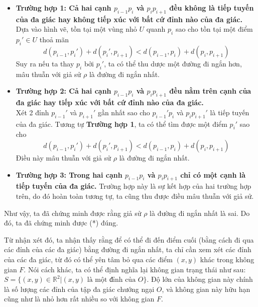 \documentclass[a4paper, 11pt]{article}
\begin{document}
\begin{itemize}
  \item \textbf{Trường hợp 1: Cả hai cạnh $p_{i-1}p_i$ và $p_ip_{i+1}$ đều không là tiếp tuyến của đa giác hay không tiếp xúc với bất cứ đỉnh nào của đa giác.}\\
  Dựa vào hình vẽ, tồn tại một vùng nhỏ $U$ quanh $p_i$ sao cho tồn tại một điểm $p_i' \in U$ thoả mãn 
  \begin{equation}
    d(p_{i-1}, p_i') + d(p_i', p_{i+1}) < d(p_{i-1}, p_i) + d(p_i, p_{i+1})
  \end{equation}
  Suy ra nếu ta thay $p_i$ bởi $p_i'$, ta có thể thu dược một đường đi ngắn hơn, mâu thuẫn với giả sử $\rho$ là đường đi ngắn nhất.

  \item \textbf{Trường hợp 2: Cả hai cạnh $p_{i-1}p_i$ và $p_ip_{i+1}$ đều nằm trên cạnh của đa giác hay tiếp xúc với bất cứ đỉnh nào của đa giác.}\\
  Xét 2 đỉnh $p_{i-1}'$ và $p_{i+1}'$ gần nhất sao cho $p_{i - 1}'p_i$ và $p_ip_{i+1}'$ là tiếp tuyến của đa giác. Tương tự \textbf{Trường hợp 1}, ta có thể tìm được một điểm $p_i'$ sao cho
  \begin{equation}
    d(p_{i-1}, p_i') + d(p_i', p_{i+1}) < d(p_{i-1}, p_i) + d(p_i, p_{i+1})
  \end{equation}
  Điều này mâu thuẫn với giả sử $\rho$ là đường đi ngắn nhất.

  \item \textbf{Trường hợp 3: Trong hai cạnh $p_{i-1}p_i$ và $p_ip_{i+1}$ chỉ có một cạnh là tiếp tuyến của đa giác.}
Trường hợp này là sự kết hợp của hai trường hợp trên, do đó hoàn toàn tương tự, ta cũng thu được điều mâu thuẫn với giả sử.
\end{itemize}


Như vậy, ta đã chứng minh được rằng giả sử $\rho$ là đường đi ngắn nhất là sai. Do đó, ta đã chứng minh được (*) đúng. 

Từ nhận xét đó, ta nhận thấy rằng để có thể đi đến điểm cuối (bằng cách đi qua các đỉnh của các đa giác) bằng đường đi ngắn nhất, ta chỉ cần xem xét các đỉnh của các đa giác, từ đó có thể yên tâm bỏ qua các điểm $(x, y)$ khác trong không gian $F$. Nói cách khác, ta có thể định nghĩa lại không gian trạng thái như sau: $S = \{(x, y) \in \mathbb{R}^2 | (x, y) \text{ là một đỉnh của } O \}$. Độ lớn của không gian này chính là số lượng các đỉnh của tập đa giác chướng ngại $O$, và không gian này hữu hạn cũng như là nhỏ hơn rất nhiều so với không gian $F$.
\end{document}
